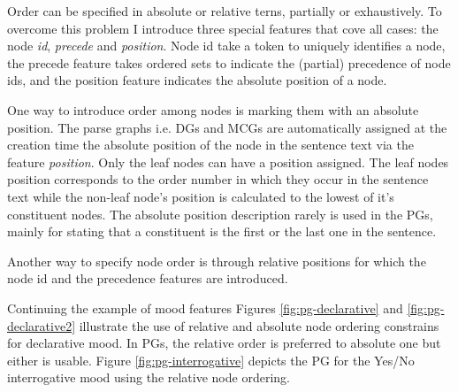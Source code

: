 Order can be specified in absolute or relative terns, partially or exhaustively. To overcome this problem I introduce three special features that cove all cases: the node \textit{id}, \textit{precede} and \textit{position}. Node id take a token to uniquely identifies a node, the precede feature takes ordered sets to indicate the (partial) precedence of node ids, and the position feature indicates the absolute position of a node.

One way to introduce order among nodes is marking them with an absolute position. The parse graphs i.e. DGs and MCGs are automatically assigned at the creation time the absolute position of the node in the sentence text via the feature \textit{position}. Only the leaf nodes can have a position assigned. The leaf nodes position corresponds to the order number in which they occur in the sentence text while the non-leaf node's position is calculated to the lowest of it's constituent nodes. The absolute position description rarely is used in the PGs, mainly for stating that a constituent is the first or the last one in the sentence.  %

Another way to specify node order is through relative positions for which the node id and the precedence features are introduced. 

Continuing the example of mood features Figures \ref{fig:pg-declarative} and \ref{fig:pg-declarative2} illustrate the use of relative and absolute node ordering constrains for declarative mood. In PGs, the relative order is preferred to absolute one but either is usable. Figure \ref{fig:pg-interrogative} depicts the PG for the Yes/No interrogative mood using the relative node ordering.    

